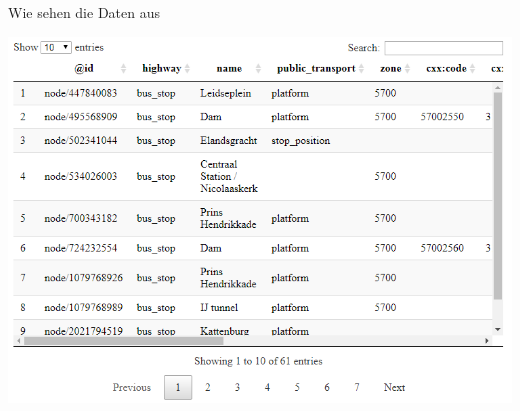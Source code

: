 \documentclass[ignorenonframetext,]{beamer}
\newenvironment{Shaded}{\begin{snugshade}}{\end{snugshade}}
\newcommand{\KeywordTok}[1]{\textcolor[rgb]{0.26,0.66,0.93}{\textbf{#1}}}
\newcommand{\NormalTok}[1]{\textcolor[rgb]{0.74,0.68,0.62}{#1}}
\newcommand{\OperatorTok}[1]{\textcolor[rgb]{0.74,0.68,0.62}{#1}}
\begin{document}
\begin{frame}[fragile]{Wie sehen die Daten aus}
\protect\hypertarget{wie-sehen-die-daten-aus}{}

\begin{Shaded}
\end{Shaded}

\includegraphics{figure/amsterdam_busstop_features.PNG}

\end{frame}
\end{document}

